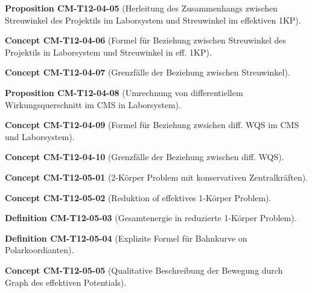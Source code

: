 \documentclass[10pt, letterpaper]{article}
\newcommand{\CustomHeading}[3]{%
  \par\medskip\noindent%
  \textbf{#1 #2} \textnormal{(#3)}.\enskip%
}
\newenvironment{DEF}[2]{\CustomHeading{Definition}{#1}{#2}}{}
\newenvironment{PROP}[2]{\CustomHeading{Proposition}{#1}{#2}}{}
\newenvironment{CONC}[2]{\CustomHeading{Concept}{#1}{#2}}{}
\begin{document}
\begin{PROP}{CM-T12-04-05}{Herleitung des Zusammenhangs zwischen Streuwinkel des Projektils im Laborsystem und Streuwinkel im effektiven 1KP}
\end{PROP}

\begin{CONC}{CM-T12-04-06}{Formel für Beziehung zwischen Streuwinkel des Projektils in Laborsystem und Streuwinkel in eff. 1KP}
\end{CONC}

\begin{CONC}{CM-T12-04-07}{Grenzfälle der Beziehung zwischen Streuwinkel}
\end{CONC}

\begin{PROP}{CM-T12-04-08}{Umrechnung von differentiellem Wirkungsquerschnitt im CMS in Laborsystem}
\end{PROP}

\begin{CONC}{CM-T12-04-09}{Formel für Beziehung zwsichen diff. WQS im CMS und Laborsystem}
\end{CONC}

\begin{CONC}{CM-T12-04-10}{Grenzfälle der Beziehung zwischen diff. WQS}
\end{CONC}

\begin{CONC}{CM-T12-05-01}{2-Körper Problem mit konservativen Zentralkräften}
\end{CONC}

\begin{CONC}{CM-T12-05-02}{Reduktion of effektives 1-Körper Problem}
\end{CONC}

\begin{DEF}{CM-T12-05-03}{Gesamtenergie in reduzierte 1-Körper Problem}
\end{DEF}

\begin{DEF}{CM-T12-05-04}{Explizite Formel für Bahnkurve on Polarkoordianten}
\end{DEF}

\begin{CONC}{CM-T12-05-05}{Qualitative Beschreibung der Bewegung durch Graph des effektiven Potentials}
\end{CONC}
\end{document}
